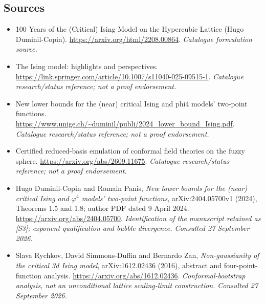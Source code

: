 \documentclass[11pt,a4paper]{article}
\numberwithin{equation}{section}
\begin{document}
\subsection{Sources}
\begin{itemize}\raggedright
\item[\textnormal{[S1]}]\hypertarget{source:30006692:1}{} 100 Years of the (Critical) Ising Model on the Hypercubic Lattice (Hugo Duminil-Copin).
\url{https://arxiv.org/html/2208.00864}.
{\small\textit{Catalogue formulation source.}}
\item[\textnormal{[S2]}]\hypertarget{source:30006692:2}{} The Ising model: highlights and perspectives.
\url{https://link.springer.com/article/10.1007/s11040-025-09515-1}.
{\small\textit{Catalogue research/status reference; not a proof endorsement.}}
\item[\textnormal{[S3]}]\hypertarget{source:30006692:3}{} New lower bounds for the (near) critical Ising and phi4 models' two-point functions.
\url{https://www.unige.ch/~duminil/publi/2024_lower_bound_Ising.pdf}.
{\small\textit{Catalogue research/status reference; not a proof endorsement.}}
\item[\textnormal{[S4]}]\hypertarget{source:30006692:4}{} Certified reduced-basis emulation of conformal field theories on the fuzzy sphere.
\url{https://arxiv.org/abs/2609.11675}.
{\small\textit{Catalogue research/status reference; not a proof endorsement.}}
\item[\textnormal{[E1]}]\hypertarget{extra:30006692:1}{} Hugo Duminil-Copin and Romain Panis,
\emph{New lower bounds for the (near) critical Ising and $\varphi^4$ models' two-point functions},
arXiv:2404.05700v1 (2024), Theorems 1.5 and 1.8; author PDF dated 9 April 2024.
\url{https://arxiv.org/abs/2404.05700}.
{\small\textit{Identification of the manuscript retained as [S3]; exponent qualification and bubble divergence. Consulted 27 September 2026.}}
\item[\textnormal{[E2]}]\hypertarget{extra:30006692:2}{} Slava Rychkov, David Simmons-Duffin and Bernardo Zan,
\emph{Non-gaussianity of the critical 3d Ising model}, arXiv:1612.02436 (2016), abstract and four-point-function analysis.
\url{https://arxiv.org/abs/1612.02436}.
{\small\textit{Conformal-bootstrap analysis, not an unconditional lattice scaling-limit construction. Consulted 27 September 2026.}}
\end{itemize}
\end{document}
